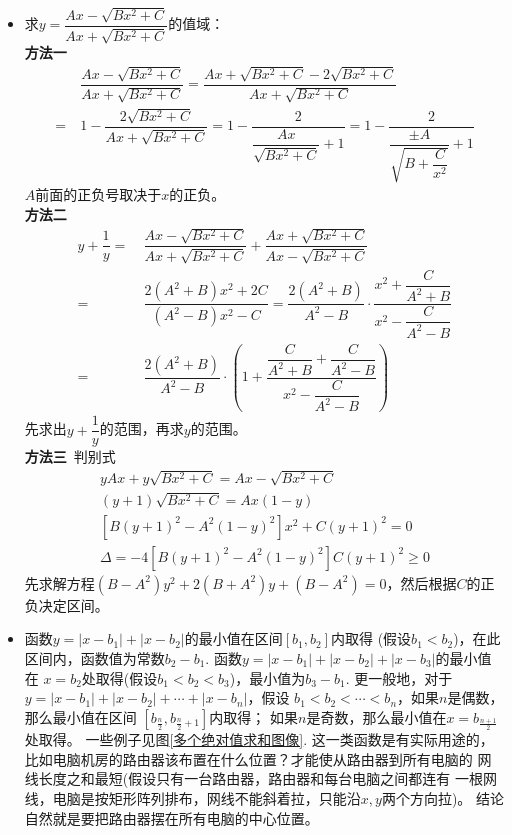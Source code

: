 \begin{itemize}[leftmargin=\inteval{\myitemleftmargin}pt,itemsep=
   \inteval{\myitemitempsep}pt,topsep=\inteval{\myitemtopsep}pt]
\item 求$ y= \dfrac{Ax-\sqrt{Bx^2+C}}{Ax+\sqrt{Bx^2+C}} $的值域：\\
\textbf{方法一}
\begin{align*}
    &\ \dfrac{Ax-\sqrt{Bx^2+C}}{Ax+\sqrt{Bx^2+C}} = 
    \dfrac{Ax+\sqrt{Bx^2+C}-2\sqrt{Bx^2+C}}{Ax+\sqrt{Bx^2+C}} \\
    =&\  1-\dfrac{2\sqrt{Bx^2+C}}{Ax+\sqrt{Bx^2+C}} 
    =1-\dfrac{2}{\dfrac{Ax}{\sqrt{Bx^2+C}}+1} 
    =1-\dfrac{2}{\dfrac{\pm A}{\sqrt{B+\dfrac{C}{x^2}}}+1} 
\end{align*}
$ A $前面的正负号取决于$ x $的正负。\\
\textbf{方法二}
\begin{align*}
    y+\dfrac{1}{y}=&\ \dfrac{Ax-\sqrt{Bx^2+C}}{Ax+\sqrt{Bx^2+C}}+
    \dfrac{Ax+\sqrt{Bx^2+C}}{Ax-\sqrt{Bx^2+C}}   \\
    =&\ \dfrac{2(A^2+B)x^2+2C}{(A^2-B)x^2-C} 
    =   \dfrac{2(A^2+B)}{A^2-B}\cdot
    \dfrac{x^2+\dfrac{C}{A^2+B}}{x^2-\dfrac{C}{A^2-B}} \\
    =&\ \dfrac{2(A^2+B)}{A^2-B}\cdot \left(1+
    \dfrac{\dfrac{C}{A^2+B}+\dfrac{C}{A^2-B}}{x^2-\dfrac{C}{A^2-B}} \right)
\end{align*}
先求出$ y+\dfrac{1}{y} $的范围，再求$ y $的范围。\\
\textbf{方法三}\ 判别式
\begin{gather*}
    yAx+y\sqrt{Bx^2+C}=Ax-\sqrt{Bx^2+C} \\
    (y+1)\sqrt{Bx^2+C}=Ax(1-y)  \\
    [B(y+1)^2-A^2(1-y)^2]x^2+C(y+1)^2=0 \\
    \Delta =-4[B(y+1)^2-A^2(1-y)^2]C(y+1)^2\geq 0
\end{gather*}
先求解方程$ (B-A^2)y^2+2(B+A^2)y+(B-A^2)=0 $，然后根据$ C $的正负决定区间。

\item 函数$ y=|x-b_1|+|x-b_2| $的最小值在区间$ [b_1,b_2] $内取得
(假设$ b_1<b_2 $)，在此区间内，函数值为常数$ b_2-b_1 $. 
函数$ y=|x-b_1|+|x-b_2|+|x-b_3| $的最小值在
$ x=b_2 $处取得(假设$ b_1<b_2<b_3 $)，最小值为$ b_3-b_1 $. 
更一般地，对于$ y=|x-b_1|+|x-b_2|+\cdots+|x-b_n| $，假设
$ b_1<b_2<\cdots<b_n $，如果$ n $是偶数，那么最小值在区间
$ [b_{\frac{n}{2}},b_{\frac{n}{2}+1}] $内取得；
如果$ n $是奇数，那么最小值在$ x=b_{\frac{n+1}{2}} $处取得。
一些例子见图\ref{多个绝对值求和图像}. 这一类函数是有实际用途的，
比如电脑机房的路由器该布置在什么位置？才能使从路由器到所有电脑的
网线长度之和最短(假设只有一台路由器，路由器和每台电脑之间都连有
一根网线，电脑是按矩形阵列排布，网线不能斜着拉，只能沿$x,y$两个方向拉)。
结论自然就是要把路由器摆在所有电脑的中心位置。


\end{itemize}
